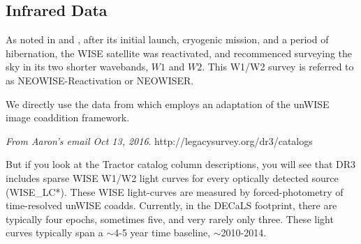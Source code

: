 \documentclass{emulateapj}
\begin{document}
    
    \subsection{Infrared Data}
    As noted in \citet{Maizner14} and \citet{Meisner16}, after its
    initial launch, cryogenic mission, and a period of hibernation, the
    WISE satellite was reactivated, and recommenced surveying the sky in
    its two shorter wavebands, $W1$ and $W2$.  This W1/W2 survey is
    referred to as NEOWISE-Reactivation or NEOWISER.
    
    We directly use the data from \citet{Meisner16} which employs an
    adaptation of the unWISE \citet{Lang14} image coaddition framework.
    
    {\it From Aaron's email Oct 13, 2016}.
    http://legacysurvey.org/dr3/catalogs
    
    But if you look at the Tractor catalog column descriptions, you will
    see that DR3 includes sparse WISE W1/W2 light curves for every
    optically detected source (WISE\_LC*). These WISE light-curves are
    measured by forced-photometry of time-resolved unWISE coadds.
    Currently, in the DECaLS footprint, there are typically four epochs,
    sometimes five, and very rarely only three. These light curves
    typically span a $\sim$4-5 year time baseline, $\sim$2010-2014.

\end{document}
